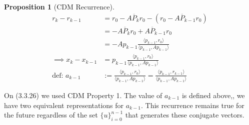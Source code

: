 \documentclass[]{article}
\theoremstyle{definition}
\newtheorem{prop}{Proposition}[section]  %
\begin{document}
            \begin{prop}[CDM Recurrence]\label{prop:CDM_Recurrence}
                \begin{align}
                    r_k - r_{k - 1} &= r_0 - A\overline{P}_kr_0 - (r_0 - A\overline{P}_{k - 1}r_0)
                    \\
                    &= - A\overline{P}_kr_0 + A\overline{P}_{k - 1}r_0
                    \\
                    &= - Ap_{k - 1}\frac{\langle p_{k - 1}, r_0\rangle}{\langle p_{k - 1}, Ap_{k - 1}\rangle}
                    \\
                    \implies 
                    x_{k} - x_{k - 1} &= 
                    p_{k - 1}\frac{\langle p_{k - 1}, r_0\rangle}{\langle p_{k - 1}, Ap_{k - 1}\rangle}
                    \\
                    \text{def: } a_{k - 1} &:= \frac{\langle p_{k - 1}, r_0\rangle}{
                        \langle p_{k - 1}, Ap_{k - 1}\rangle
                    } = 
                    \frac{\langle p_{k - 1}, r_{k - 1}\rangle}{
                        \langle p_{k - 1}, Ap_{k - 1}\rangle
                    }
            \end{align}
            \end{prop}
            On (3.3.26) we used CDM Property 1. The value of $a_{k - 1}$ is defined above,, we have two equivalent representations for $a_{k - 1}$. This recurrence remains true for the future regardless of the set $\{u\}_{i = 0}^{n-1}$ that generates these conjugate vectors. 
\end{document}
